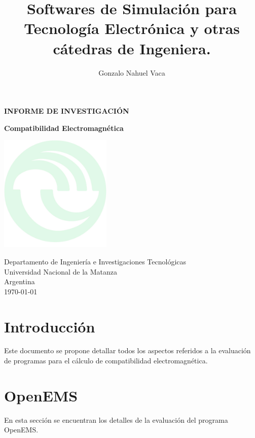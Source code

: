 \documentclass[
    11pt,
    spanish,
	a4paper
]{article}
\title{Softwares de Simulación para Tecnología Electrónica y otras cátedras de
  Ingeniera.}
\author{Gonzalo Nahuel Vaca}
\def\doctype{INFORME DE INVESTIGACIÓN}
\begin{document}
\makeatletter
\begin{titlepage}
	\begin{center}
		\vspace*{1cm}

		\Huge
		\textbf{\doctype}
		\vspace{0.5cm}

		\LARGE
		\@title
		\vspace{0.5cm}

		\textbf{Compatibilidad Electromagnética}

		\vspace{1.5cm}

		\textbf{\@author}

		\vspace{1.5cm}

		\includegraphics[width=0.4\textwidth]{img/logoUNLaM.jpeg}

		\vfill
		Departamento de Ingeniería e Investigaciones Tecnológicas\\
		Universidad Nacional de la Matanza\\
		Argentina\\
		\today
	\end{center}
\end{titlepage}
\makeatother
\newpage

\section{Introducción}
\label{sec:introduccion}

Este documento se propone detallar todos los aspectos referidos a la evaluación
de programas para el cálculo de compatibilidad electromagnética.

\section{OpenEMS}
\label{sec:openems}

En esta sección se encuentran los detalles de la evaluación del programa OpenEMS.
\end{document}
